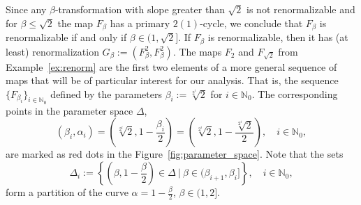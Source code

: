 \documentclass[10pt,reqno]{amsart}
\theoremstyle{plain}
\theoremstyle{assumption}
\theoremstyle{notation}
\theoremstyle{claim}
\theoremstyle{conj}
\theoremstyle{theorem}
\theoremstyle{proposition}
\theoremstyle{corollary}
\begin{document}
Since any $\beta$-transformation with slope greater than $\sqrt{2}$ is not renormalizable and for $\beta\leq\sqrt{2}$ the map $F_{\beta}$ has a primary $2(1)$-cycle, we conclude that $F_{\beta}$ is renormalizable if and only if $\beta\in(1,\sqrt{2}]$. If $F_{\beta}$ is renormalizable, then it has (at least) renormalization $G_{\beta}:=(F^2_{\beta},F^2_{\beta})$. The maps $F_{2}$ and $F_{\sqrt{2}}$ from Example~\ref{ex:renorm} are the first two elements of a more general sequence of maps that will be of particular interest for our analysis. That is, the sequence $\{F_{\beta_i}\}_{i\in\mathbb{N}_0}$ defined by the parameters $\beta_i:=\sqrt[2^i]{2}$ for $i\in\mathbb{N}_0$. The corresponding points in the parameter space $\Delta$,
\begin{equation}
    \label{eq:parameter_points}
    (\beta_i,\alpha_i)=\left(\sqrt[2^i]{2},1-\frac{\beta_i}{2}\right)=\left(\sqrt[2^i]{2},1-\frac{\sqrt[2^i]{2}}{2}\right),\quad i\in\mathbb{N}_0,
\end{equation}
are marked as red dots in the Figure~\ref{fig:parameter_space}. Note that the sets
$$
\Delta_i:=\left\lbrace\left(\beta,1-\frac{\beta}{2}\right)\in\Delta\:|\:\beta\in(\beta_{i+1},\beta_i]\right\rbrace,\quad i\in\mathbb{N}_0,
$$
form a partition of the curve $\alpha=1-\frac{\beta}{2}$, $\beta\in(1,2]$.
\end{document}
